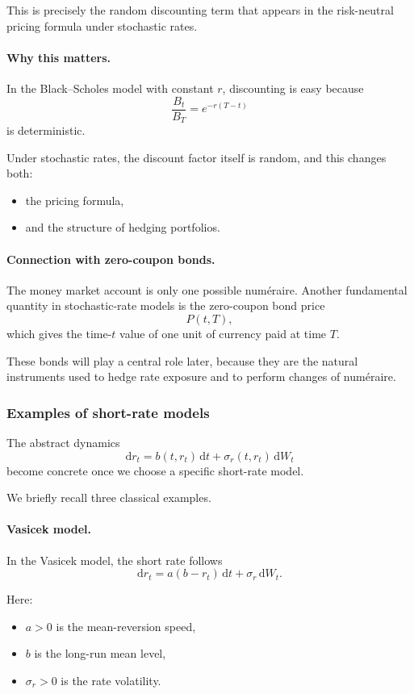 \documentclass[11pt]{article}
\theoremstyle{plain}
\theoremstyle{definition}
\theoremstyle{remark}
\begin{document}
This is precisely the random discounting term that appears in the
risk-neutral pricing formula under stochastic rates.

\paragraph{Why this matters.}
In the Black--Scholes model with constant \(r\), discounting is easy
because
\[
\frac{B_t}{B_T}=e^{-r(T-t)}
\]
is deterministic.

Under stochastic rates, the discount factor itself is random, and this
changes both:
\begin{itemize}[leftmargin=1.4em]
    \item the pricing formula,
    \item and the structure of hedging portfolios.
\end{itemize}

\paragraph{Connection with zero-coupon bonds.}
The money market account is only one possible numéraire.
Another fundamental quantity in stochastic-rate models is the
zero-coupon bond price
\[
P(t,T),
\]
which gives the time-\(t\) value of one unit of currency paid at time
\(T\).

These bonds will play a central role later, because they are the natural
instruments used to hedge rate exposure and to perform changes of
numéraire.

\subsubsection{Examples of short-rate models}

The abstract dynamics
\[
\mathrm{d}r_t=b(t,r_t)\,\mathrm{d}t+\sigma_r(t,r_t)\,\mathrm{d}W_t
\]
become concrete once we choose a specific short-rate model.

We briefly recall three classical examples.

\paragraph{Vasicek model.}
In the Vasicek model, the short rate follows
\[
\boxed{
\mathrm{d}r_t=a(b-r_t)\,\mathrm{d}t+\sigma_r\,\mathrm{d}W_t.
}
\]

Here:
\begin{itemize}[leftmargin=1.4em]
    \item \(a>0\) is the mean-reversion speed,
    \item \(b\) is the long-run mean level,
    \item \(\sigma_r>0\) is the rate volatility.
\end{itemize}
\end{document}
